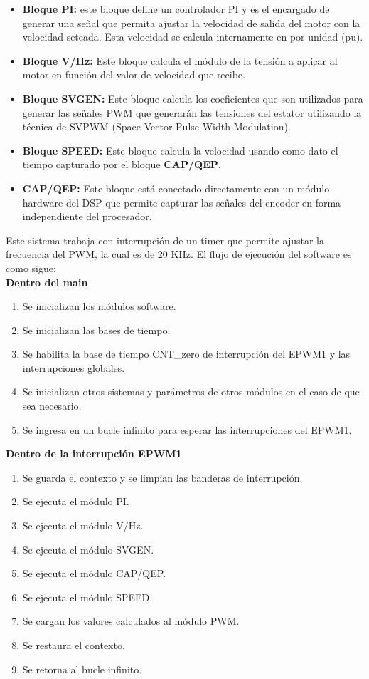 \documentclass[conference]{IEEEtran}
\begin{document}
\begin{itemize}
	\item \textbf{Bloque PI:} este bloque define un controlador PI y es el encargado de generar una señal que permita ajustar la velocidad de salida del motor con la velocidad seteada. Esta velocidad se calcula internamente en por unidad (pu).
	\item \textbf{Bloque V/Hz:} Este bloque calcula el módulo de la tensión a aplicar al motor en función del valor de velocidad que recibe.
	\item \textbf{Bloque SVGEN:} Este bloque calcula los coeficientes que son utilizados para generar las señales PWM que generarán las tensiones del estator utilizando la técnica de SVPWM (Space Vector Pulse Width Modulation\cite{Mohan}\cite{Rashid}).
	\item \textbf{Bloque SPEED:} Este bloque calcula la velocidad usando como dato el tiempo capturado por el bloque \textbf{CAP/QEP}.
	\item \textbf{CAP/QEP:} Este bloque está conectado directamente con un módulo hardware del DSP que permite capturar las señales del encoder en forma independiente del procesador.
\end{itemize}


Este sistema trabaja con interrupción de un timer que permite ajustar la frecuencia del PWM, la cual es de 20 KHz. El flujo de ejecución del software es como sigue:\\

\textbf{Dentro del main}
\begin{enumerate}
	\item Se inicializan los módulos software.
	\item Se inicializan las bases de tiempo.
	\item Se habilita la  base de tiempo CNT\_zero de interrupción del EPWM1 y las interrupciones globales.
	\item Se inicializan otros sistemas y parámetros de otros módulos en el caso de que sea necesario.
	\item Se ingresa en un bucle infinito para esperar las interrupciones del EPWM1.
\end{enumerate}


\textbf{Dentro de la interrupción EPWM1}
\begin{enumerate}
	\item Se guarda el contexto y se limpian las banderas de interrupción.
	\item Se ejecuta el módulo PI.
	\item Se ejecuta el módulo V/Hz.
	\item Se ejecuta el módulo SVGEN.
	\item Se ejecuta el módulo CAP/QEP.
	\item Se ejecuta el módulo SPEED.
	\item Se cargan los valores calculados al módulo PWM.
	\item Se restaura el contexto.
	\item Se retorna al bucle infinito.
\end{enumerate}
\end{document}
